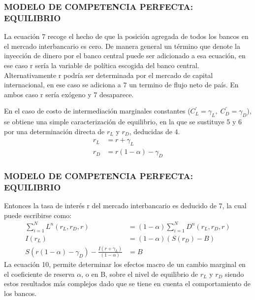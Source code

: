 \documentclass[10pt, xcolor=table, x11names]{beamer}
\begin{document}
\begin{frame}
    \frametitle{{\normalsize MODELO DE COMPETENCIA PERFECTA: EQUILIBRIO} {}}
   La ecuación 7 recoge el hecho de que la posición agregada de todos los bancos en el mercado interbancario es cero. De manera general un término que denote la inyección de dinero por el banco central puede ser adicionado a esa ecuación, en ese caso r sería la variable de política escogida del banco central. Alternativamente r podría ser determinada por el mercado de capital internacional, en ese caso se adiciona a 7 un termino de flujo neto de país. En ambos caso r sería exógeno y 7 desaparece.
   
   En el caso de costo de intermediación  marginales constantes ($C_{L}^{'}=\gamma_{L},\; C_{D}^{'}=\gamma_{D} $),  se obtiene una simple caracterización de equilibrio, en la que se sustituye 5 y 6 por una determinación directa de $r_{L}$ y $r_{D}$, deducidas de 4.
   \begin{align}
   r_{L}&=r+\gamma_{L} \\
   r_{D}&=r(1-\alpha)-\gamma_{D} 
   \end{align} 
    
\end{frame}



\begin{frame}
    \frametitle{{\normalsize MODELO DE COMPETENCIA PERFECTA: EQUILIBRIO} {}}
    Entonces la tasa de interés r del mercado interbancario es deducido de 7, la cual puede escribirse como:
    \begin{align}
    \sum_{i=1}^{N}L^{n}(r_{L}, r_{D}, r)&=(1-\alpha)\sum_{i=1}^{N}D^{n}(r_{L}, r_{D}, r)  \nonumber \\
    I(r_{L})&=(1-\alpha)(S(r_{D})-B) \nonumber \\
    S(r(1-\alpha)-\gamma_{D})-\frac{I(r+\gamma_{L})}{(1-\alpha)} &=B
    \end{align} 
    La ecuación 10, permite determinar los efectos macro de un cambio marginal en el coeficiente de reserva $\alpha$, o en B, sobre el nivel de equilibrio de $r_{L}$ y $r_{D}$ siendo estos resultados más complejos dado que se tiene en cuenta el comportamiento de los bancos.
\end{frame}
\end{document}

